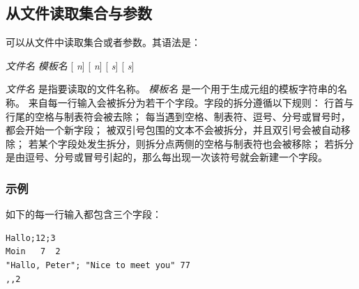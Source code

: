 \subsection{从文件读取集合与参数}\label{initfromfile}
可以从文件中读取集合或者参数。其语法是：

\smallskip
{} \emph{文件名}  \emph{模板名}
[ \emph{n}] [ \emph{n}]
[ \emph{s}] [ \emph{s}]

\smallskip
\noindent\emph{文件名} 是指要读取的文件名称。
\emph{模板名} 是一个用于生成元组的模板字符串的名称。
来自每一行输入会被拆分为若干个字段。字段的拆分遵循以下规则：
行首与行尾的空格与制表符会被去除；
每当遇到空格、制表符、逗号、分号或冒号时，都会开始一个新字段；
被双引号包围的文本不会被拆分，并且双引号会被自动移除；
若某个字段处发生拆分，则拆分点两侧的空格与制表符也会被移除；
若拆分是由逗号、分号或冒号引起的，那么每出现一次该符号就会新建一个字段。

\subsubsection{示例}
如下的每一行输入都包含三个字段：%
{\small
\begin{verbatim}
Hallo;12;3
Moin   7  2
"Hallo, Peter"; "Nice to meet you" 77
,,2
\end{verbatim}
}


